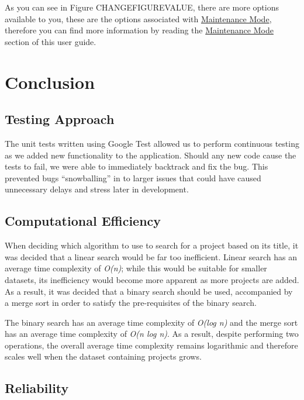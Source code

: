 \documentclass[
  english,
  a4paper,
,tablecaptionabove
]{scrartcl}
\begin{document}
As you can see in Figure CHANGEFIGUREVALUE, there are more options
available to you, these are the options associated with
\protect\hyperlink{using-maintenance-mode}{Maintenance Mode}, therefore
you can find more information by reading the
\protect\hyperlink{using-maintenance-mode}{Maintenance Mode} section of
this user guide.

\newpage

\hypertarget{conclusion}{%
\section{Conclusion}\label{conclusion}}

\hypertarget{testing-approach}{%
\subsection{Testing Approach}\label{testing-approach}}

The unit tests written using Google Test allowed us to perform
continuous testing as we added new functionality to the application.
Should any new code cause the tests to fail, we were able to immediately
backtrack and fix the bug. This prevented bugs \enquote{snowballing} in
to larger issues that could have caused unnecessary delays and stress
later in development.

\hypertarget{computational-efficiency}{%
\subsection{Computational Efficiency}\label{computational-efficiency}}

When deciding which algorithm to use to search for a project based on
its title, it was decided that a linear search would be far too
inefficient. Linear search has an average time complexity of
\emph{O(n)}; while this would be suitable for smaller datasets, its
inefficiency would become more apparent as more projects are added. As a
result, it was decided that a binary search should be used, accompanied
by a merge sort in order to satisfy the pre-requisites of the binary
search.

The binary search has an average time complexity of \emph{O(log n)} and
the merge sort has an average time complexity of \emph{O(n log n)}. As a
result, despite performing two operations, the overall average time
complexity remains logarithmic and therefore scales well when the
dataset containing projects grows.

\hypertarget{reliability}{%
\subsection{Reliability}\label{reliability}}
\end{document}
